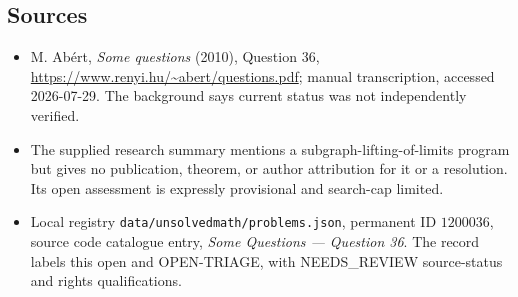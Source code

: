 \documentclass[11pt]{article}
\begin{document}
\subsection{Sources}
\begin{itemize}
\item M. Ab\'ert, \emph{Some questions} (2010), Question 36, \url{https://www.renyi.hu/~abert/questions.pdf}; manual transcription, accessed 2026-07-29. The background says current status was not independently verified.
\item The supplied research summary mentions a subgraph-lifting-of-limits program but gives no publication, theorem, or author attribution for it or a resolution. Its open assessment is expressly provisional and search-cap limited.
\item Local registry \texttt{data/unsolvedmath/problems.json}, permanent ID $1200036$, source code catalogue entry, \emph{Some Questions --- Question 36}. The record labels this open and OPEN-TRIAGE, with NEEDS\_REVIEW source-status and rights qualifications.
\end{itemize}
\end{document}

